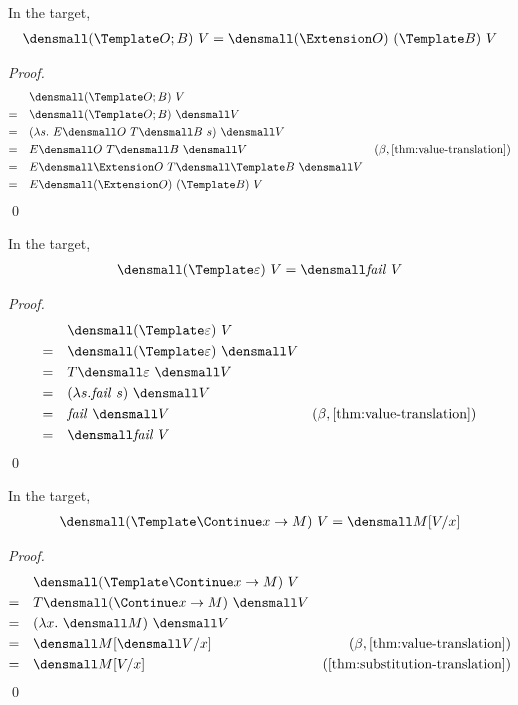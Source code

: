 \begin{lemma}
  \label{thm:templ-ext}
  In the target,
  \begin{align*}
    \den{(\Template O; B) ~ V} = \den{(\Extension O) ~ (\Template B) ~ V}
  \end{align*}
\end{lemma}
\begin{proof}
  \begin{align*}
    &\quad \den{(\Template O; B) ~ V} \\
    =& \quad \den{(\Template O; B)} ~ \den{V} \\
    =& \quad (\lambda s. ~E\den{O} ~T\den{B} ~s) ~ \den{V} \\
    =& \quad E\den{O} ~T\den{B} ~ \den{V} & (\beta, \cref{thm:value-translation}) \\
    =& \quad E\den{\Extension O} ~T\den{\Template B} ~ \den{V} \\
    =& \quad E\den{(\Extension O) ~ (\Template B) ~ V}
  \end{align*}
  \qed
\end{proof}

\begin{lemma}
  \label{thm:templ-fail}
  In the target,
  \begin{align*}
    \den{(\Template \varepsilon) ~ V} = \den{\mathit{fail}~V}
  \end{align*}
\end{lemma}
\begin{proof}
  \begin{align*}
    &\quad \den{(\Template \varepsilon) ~ V} \\
    =& \quad \den{(\Template \varepsilon)} ~ \den{V}\\
    =& \quad T\den{\varepsilon} ~ \den{V} \\
    =& \quad (\lambda s. \mathit{fail} ~ s) ~ \den{V} \\
    =& \quad \mathit{fail} ~ \den{V} &(\beta, \cref{thm:value-translation}) \\
    =& \quad \den{\mathit{fail} ~ V}
  \end{align*}
  \qed
\end{proof}

\begin{lemma}
  \label{thm:templ-continue}
  In the target,
  \begin{align*}
    \den{(\Template \Continue x \to M) ~ V} = \den{M\subst{x}{V}}
  \end{align*}
\end{lemma}
\begin{proof}
  \begin{align*}
    &\quad \den{(\Template \Continue x \to M) ~ V} \\
    =& \quad T\den{(\Continue x \to M)} ~ \den{V}\\
    =& \quad (\lambda x. ~\den{M}) ~ \den{V} \\
    =& \quad \den{M}\subst{x}{\den{V}} & (\beta, \cref{thm:value-translation}) \\
    =& \quad \den{M\subst{x}{V}} &(\cref{thm:substitution-translation})
  \end{align*}
  \qed
\end{proof}

